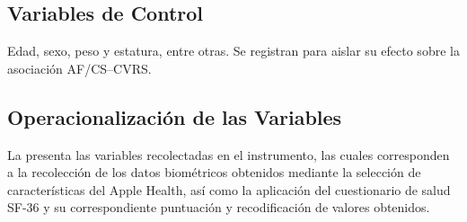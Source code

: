 \subsection{Variables de Control}
\label{subsec:variables_control}

Edad, sexo, peso y estatura, entre otras. Se registran para aislar su efecto sobre la asociación AF/CS--CVRS.

\subsection{Operacionalización de las Variables}
\label{subsec:operacionalizacion_variables}

La  presenta las variables recolectadas en el instrumento, las cuales corresponden a la recolección de los datos biométricos obtenidos mediante la selección de características del Apple Health, así como la aplicación del cuestionario de salud SF-36 y su correspondiente puntuación y recodificación de valores obtenidos.

